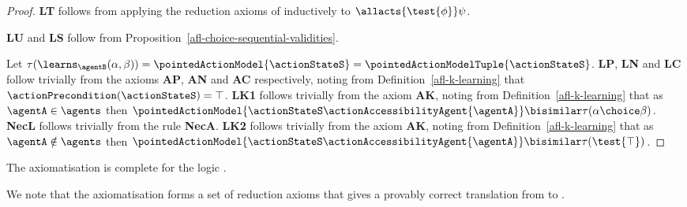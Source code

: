 \documentclass[twoside]{aiml14}
\begin{document}
  \begin{proof}
      {\bf LT} follows from applying the reduction axioms of \axiomAmlK{}
      inductively to $\allacts{\test{\phi}} \psi$.

      {\bf LU} and {\bf LS} follow from Proposition~\ref{afl-choice-sequential-validities}.

      Let $\tau(\learns_\agentB (\alpha, \beta)) = \pointedActionModel{\actionStateS} = \pointedActionModelTuple{\actionStateS}$.
      {\bf LP}, {\bf LN} and {\bf LC} follow trivially from the \axiomAmlK{}
      axioms {\bf AP}, {\bf AN} and {\bf AC} respectively, noting from
      Definition~\ref{afl-k-learning} that $\actionPrecondition(\actionStateS) = \top$.
      {\bf LK1} follows trivially from the \axiomAmlK{} axiom {\bf AK},
      noting from Definition~\ref{afl-k-learning} that as $\agentA \in \agents$ then 
      $\pointedActionModel{\actionStateS \actionAccessibilityAgent{\agentA}} \bisimilar \tau(\alpha \choice \beta)$.
      {\bf NecL} follows trivially from the \axiomAmlK{} rule {\bf NecA}.
      {\bf LK2} follows trivially from the \axiomAmlK{} axiom {\bf AK},
      noting from Definition~\ref{afl-k-learning} that as $\agentA \notin \agents$ then 
      $\pointedActionModel{\actionStateS \actionAccessibilityAgent{\agentA}} \bisimilar \tau(\test{\top})$.
  \end{proof}

  \begin{proposition}\label{afl-k-axioms-completeness}
      The axiomatisation \axiomAflK{} is complete for the logic \logicAmlK{}.
  \end{proposition}

  We note that the axiomatisation \axiomAflK{} forms a set of reduction axioms
  that gives a provably correct translation from \langAfl{} to \lang{}.
\end{document}
